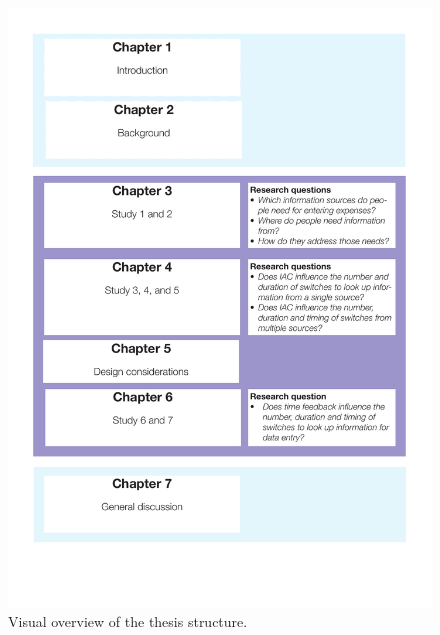 \begin{figure}
\centering
\includegraphics[width=1\textwidth]{images/ThesisOverview.pdf}
\caption{Visual overview of the thesis structure.}
\label{fig:ch56-Figure2}
\end{figure}

